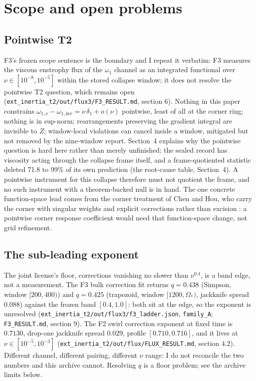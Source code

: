 \section{Scope and open problems}\label{sec:scope}

\subsection{Pointwise T2}\label{sec:t2open}

F3's frozen scope sentence is the boundary and I repeat it verbatim: F3
measures the viscous enstrophy flux of the $\omega_1$ channel as an
integrated functional over $\nu \in [10^{-8}, 10^{-5}]$ within the
stored collapse window; it does not resolve the pointwise T2 question,
which remains open
(\texttt{ext\_inertia\_t2/out/flux3/F3\_RESULT.md}, section 6). Nothing
in this paper constrains
$\omega_{1,\nu} - \omega_{1,\mathrm{inv}} = \nu\,\delta_1 + o(\nu)$
pointwise, least of all at the corner ring; nothing is in sup-norm;
rearrangements preserving the gradient integral are invisible to $Z$;
window-local violations can cancel inside a window, mitigated but not
removed by the nine-window report. Section~4 explains why the pointwise
question is hard here rather than merely unfinished: the sealed record
has viscosity acting through the collapse frame itself, and a
frame-quotiented statistic deleted 71.8 to 99\% of its own prediction
(the root-cause table, Section~4). A pointwise instrument for this
collapse therefore must not quotient the frame, and no such instrument
with a theorem-backed null is in hand. The one concrete function-space
lead comes from the corner treatment of Chen and Hou, who carry the
corner with singular weights and explicit corrections rather than
excision \cite{ChenHou}: a pointwise corner response coefficient would
need that function-space change, not grid refinement.

\subsection{The sub-leading exponent}\label{sec:subleading}

The joint license's floor, corrections vanishing no slower than
$\nu^{0.4}$, is a band edge, not a measurement. The F3 bulk correction
fit returns $q = 0.438$ (Simpson, window $[200, 400)$) and $q = 0.425$
(trapezoid, window $[1200, \Omega_*)$, jackknife spread $0.088$)
against the frozen band $[0.4, 1.0]$: both sit at the edge, so the
exponent is unresolved
(\texttt{ext\_inertia\_t2/out/flux3/f3\_ladder.json},
\texttt{family\_A}; \texttt{F3\_RESULT.md}, section 9). The F2 swirl
correction exponent at fixed time is $0.7130$, drop-one jackknife
spread $0.029$, profile $[0.710, 0.716]$, and it lives at
$\nu \in [10^{-5}, 10^{-3}]$
(\texttt{ext\_inertia\_t2/out/flux/FLUX\_RESULT.md}, section 4.2).
Different channel, different pairing, different $\nu$ range: I do not
reconcile the two numbers and this archive cannot. Resolving $q$ is a
floor problem; see the archive limits below.

